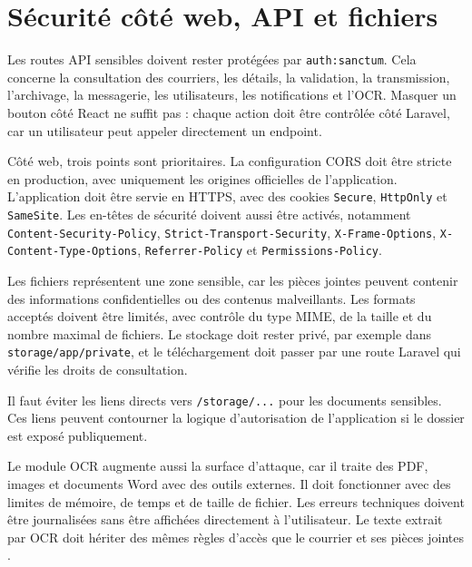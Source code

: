 \section{Sécurité côté web, API et fichiers}
\label{sec:securite-web-api-fichiers}

Les routes API sensibles doivent rester protégées par \texttt{auth:sanctum}. Cela concerne la consultation des courriers, les détails, la validation, la transmission, l'archivage, la messagerie, les utilisateurs, les notifications et l'OCR. Masquer un bouton côté React ne suffit pas : chaque action doit être contrôlée côté Laravel, car un utilisateur peut appeler directement un endpoint.

Côté web, trois points sont prioritaires. La configuration CORS doit être stricte en production, avec uniquement les origines officielles de l'application. L'application doit être servie en HTTPS, avec des cookies \texttt{Secure}, \texttt{HttpOnly} et \texttt{SameSite}. Les en-têtes de sécurité doivent aussi être activés, notamment \texttt{Content-Security-Policy}, \texttt{Strict-Transport-Security}, \texttt{X-Frame-Options}, \texttt{X-Content-Type-Options}, \texttt{Referrer-Policy} et \texttt{Permissions-Policy}.

Les fichiers représentent une zone sensible, car les pièces jointes peuvent contenir des informations confidentielles ou des contenus malveillants. Les formats acceptés doivent être limités, avec contrôle du type MIME, de la taille et du nombre maximal de fichiers. Le stockage doit rester privé, par exemple dans \texttt{storage/app/private}, et le téléchargement doit passer par une route Laravel qui vérifie les droits de consultation.

Il faut éviter les liens directs vers \texttt{/storage/...} pour les documents sensibles. Ces liens peuvent contourner la logique d'autorisation de l'application si le dossier est exposé publiquement.

Le module OCR augmente aussi la surface d'attaque, car il traite des PDF, images et documents Word avec des outils externes. Il doit fonctionner avec des limites de mémoire, de temps et de taille de fichier. Les erreurs techniques doivent être journalisées sans être affichées directement à l'utilisateur. Le texte extrait par OCR doit hériter des mêmes règles d'accès que le courrier et ses pièces jointes \cite{documentation-ocr}.

